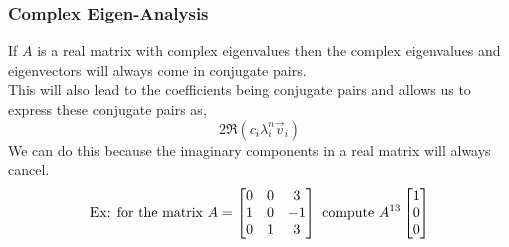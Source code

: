 \documentclass[11pt, fleqn]{article}
\begin{document}
\subsubsection{Complex Eigen-Analysis}
If $A$ is a real matrix with complex eigenvalues then the complex eigenvalues and eigenvectors will always come in conjugate pairs.\\
This will also lead to the coefficients being conjugate pairs and allows us to express these conjugate pairs as,
$$2\Re(c_i\lambda_i^n\vec{v}_i)$$
We can do this because the imaginary components in a real matrix will always cancel.
\begin{align*}
    \text{Ex: for the matrix }A=\matrixx{0&0&3\\1&0&-1\\0&1&3}\text{ compute }A^{13}\matrixx{1\\0\\0}
\end{align*}
\end{document}
